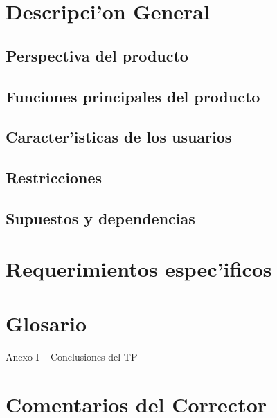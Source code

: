 \documentclass[a4paper, 10pt,titlepage]{article}
\begin{document}
\section{Descripci'on General	}
    \subsection{ Perspectiva del producto	}
    \subsection{ Funciones principales del producto 	}
    \subsection{ Caracter'isticas de los usuarios	}
    \subsection{ Restricciones	}
    \subsection{ Supuestos y dependencias	}

\section{ Requerimientos espec'ificos	}
\section{Glosario}

\appendix 
Anexo I – Conclusiones del TP 
\section{  Comentarios del Corrector}
  \newpage




\listoffigures
\end{document}
